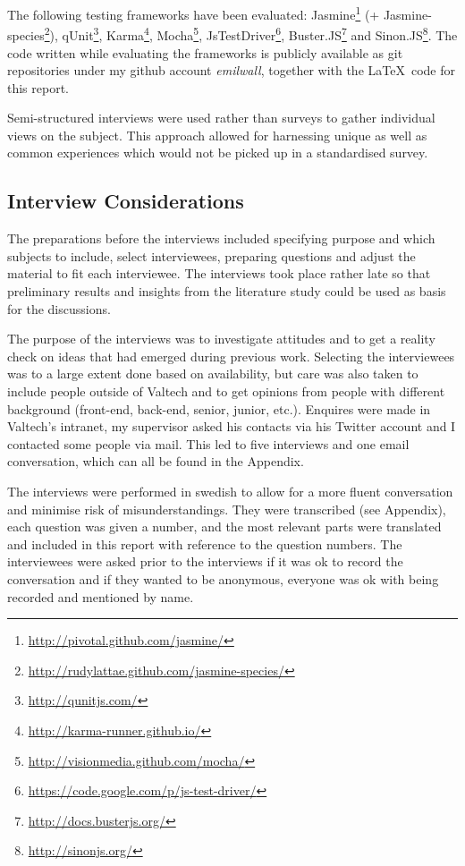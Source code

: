 \documentclass[11pt]{article}
\begin{document}
The following testing frameworks have been evaluated:
Jasmine\footnote{\url{http://pivotal.github.com/jasmine/}} (+ Jasmine-species\footnote{\url{http://rudylattae.github.com/jasmine-species/}}),
qUnit\footnote{\url{http://qunitjs.com/}},
Karma\footnote{\url{http://karma-runner.github.io/}},
Mocha\footnote{\url{http://visionmedia.github.com/mocha/}},
JsTestDriver\footnote{\url{https://code.google.com/p/js-test-driver/}},
Buster.JS\footnote{\url{http://docs.busterjs.org/}} and
Sinon.JS\footnote{\url{http://sinonjs.org/}}. The code written while evaluating the frameworks is publicly available as git repositories under my github account \emph{emilwall}, together with the \LaTeX~code for this report.

Semi-structured interviews were used rather than surveys to gather individual views on the subject. This approach allowed for harnessing unique as well as common experiences which would not be picked up in a standardised survey.

\subsection{Interview Considerations}

The preparations before the interviews included specifying purpose and which subjects to include, select interviewees, preparing questions and adjust the material to fit each interviewee. The interviews took place rather late so that preliminary results and insights from the literature study could be used as basis for the discussions.

The purpose of the interviews was to investigate attitudes and to get a reality check on ideas that had emerged during previous work. Selecting the interviewees was to a large extent done based on availability, but care was also taken to include people outside of Valtech and to get opinions from people with different background (front-end, back-end, senior, junior, etc.). Enquires were made in Valtech's intranet, my supervisor asked his contacts via his Twitter account and I contacted some people via mail. This led to five interviews and one email conversation, which can all be found in the Appendix.

The interviews were performed in swedish to allow for a more fluent conversation and minimise risk of misunderstandings. They were transcribed (see Appendix), each question was given a number, and the most relevant parts were translated and included in this report with reference to the question numbers. The interviewees were asked prior to the interviews if it was ok to record the conversation and if they wanted to be anonymous, everyone was ok with being recorded and mentioned by name.
\end{document}
